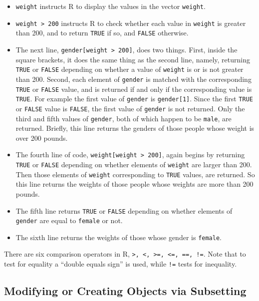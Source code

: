 \documentclass[
]{krantz}
\providecommand{\tightlist}{%
  \setlength{\itemsep}{0pt}\setlength{\parskip}{0pt}}
\begin{document}
\begin{itemize}
\tightlist
\item
  \texttt{weight} instructs R to display the values in the vector \texttt{weight}.
\item
  \texttt{weight\ \textgreater{}\ 200} instructs R to check whether each value in \texttt{weight} is greater than 200, and to return \texttt{TRUE} if so, and \texttt{FALSE} otherwise.
\item
  The next line, \texttt{gender{[}weight\ \textgreater{}\ 200{]}}, does two things. First, inside the square brackets, it does the same thing as the second line, namely, returning \texttt{TRUE} or \texttt{FALSE} depending on whether a value of \texttt{weight} is or is not greater than 200. Second, each element of \texttt{gender} is matched with the corresponding \texttt{TRUE} or \texttt{FALSE} value, and is returned if and only if the corresponding value is \texttt{TRUE}. For example the first value of \texttt{gender} is \texttt{gender{[}1{]}}. Since the first \texttt{TRUE} or \texttt{FALSE} value is \texttt{FALSE}, the first value of \texttt{gender} is not returned. Only the third and fifth values of \texttt{gender}, both of which happen to be \texttt{male}, are returned. Briefly, this line returns the genders of those people whose weight is over 200 pounds.
\item
  The fourth line of code, \texttt{weight{[}weight\ \textgreater{}\ 200{]}}, again begins by returning \texttt{TRUE} or \texttt{FALSE} depending on whether elements of \texttt{weight} are larger than 200. Then those elements of \texttt{weight} corresponding to \texttt{TRUE} values, are returned. So this line returns the weights of those people whose weights are more than 200 pounds.
\item
  The fifth line returns \texttt{TRUE} or \texttt{FALSE} depending on whether elements of \texttt{gender} are equal to \texttt{female} or not.
\item
  The sixth line returns the weights of those whose gender is \texttt{female}.
\end{itemize}

There are six comparison operators in R, \texttt{\textgreater{},\ \textless{},\ \textgreater{}=,\ \textless{}=,\ ==,\ !=}. Note that to test for equality a ``double equals sign'' is used, while \texttt{!=} tests for inequality.

\hypertarget{modifying-or-creating-objects-via-subsetting}{%
\subsection{Modifying or Creating Objects via Subsetting}\label{modifying-or-creating-objects-via-subsetting}}
\end{document}
